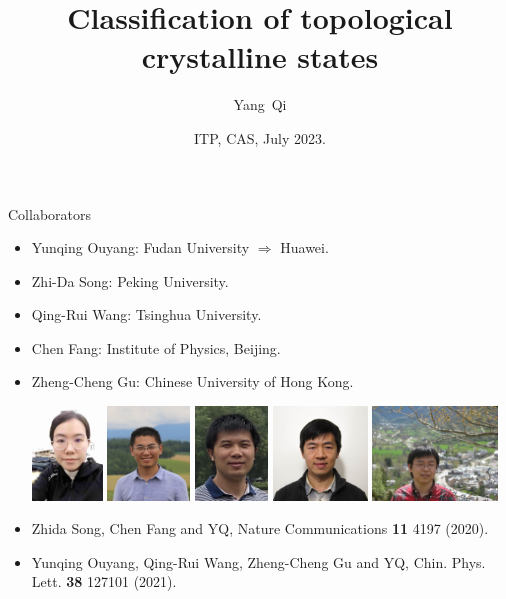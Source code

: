 \documentclass[xcolor=table, 11pt, aspectratio=169]{beamer}
\title[Space-group SPTs] %
{Classification of topological crystalline states}
\author[Y Qi] %
{Yang~Qi}
\institute[Fudan] %
{Department of Physics, Fudan University}
\date{ITP, CAS, July 2023.}
\begin{document}
\begin{frame}
  \titlepage
\end{frame}

\begin{frame}{Collaborators}
  \begin{itemize}
  \item Yunqing Ouyang: Fudan University $\Rightarrow$ Huawei.
  \item Zhi-Da Song: Peking University.
  \item Qing-Rui Wang: Tsinghua University.
  \item Chen Fang: Institute of Physics, Beijing.
  \item Zheng-Cheng Gu: Chinese University of Hong Kong.
    \begin{center}
      \includegraphics[height=2.5cm]{../people/yunqing}
      \includegraphics[height=2.5cm]{../people/zhidasong}
      \includegraphics[height=2.5cm]{../people/qingrui}      
      \includegraphics[height=2.5cm]{../people/chenfang}
      \includegraphics[height=2.5cm]{../people/zhengcheng}
    \end{center}
  \item Zhida Song, Chen Fang and YQ, Nature Communications \textbf{11} 4197 (2020).
  \item Yunqing Ouyang, Qing-Rui Wang, Zheng-Cheng Gu and YQ, Chin. Phys. Lett. \textbf{38} 127101 (2021).
\end{itemize}
\end{frame}
\end{document}
